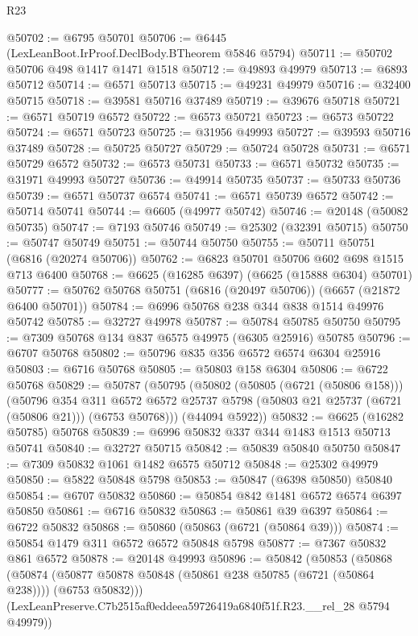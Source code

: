 \begin{lexlean}{R23}
\begin{coremodule}
@50702 := @6795 @50701
@50706 := @6445 (LexLeanBoot.IrProof.DeclBody.BTheorem @5846 @5794)
@50711 := @50702 @50706 @498 @1417 @1471 @1518
@50712 := @49893 @49979
@50713 := @6893 @50712
@50714 := @6571 @50713
@50715 := @49231 @49979
@50716 := @32400 @50715
@50718 := @39581 @50716 @37489
@50719 := @39676 @50718
@50721 := @6571 @50719 @6572
@50722 := @6573 @50721
@50723 := @6573 @50722
@50724 := @6571 @50723
@50725 := @31956 @49993
@50727 := @39593 @50716 @37489
@50728 := @50725 @50727
@50729 := @50724 @50728
@50731 := @6571 @50729 @6572
@50732 := @6573 @50731
@50733 := @6571 @50732
@50735 := @31971 @49993 @50727
@50736 := @49914 @50735
@50737 := @50733 @50736
@50739 := @6571 @50737 @6574
@50741 := @6571 @50739 @6572
@50742 := @50714 @50741
@50744 := @6605 (@49977 @50742)
@50746 := @20148 (@50082 @50735)
@50747 := @7193 @50746
@50749 := @25302 (@32391 @50715)
@50750 := @50747 @50749
@50751 := @50744 @50750
@50755 := @50711 @50751 (@6816 (@20274 @50706))
@50762 := @6823 @50701 @50706 @602 @698 @1515 @713 @6400
@50768 := @6625 (@16285 @6397) (@6625 (@15888 @6304) @50701)
@50777 := @50762 @50768 @50751 (@6816 (@20497 @50706)) (@6657 (@21872 @6400 @50701))
@50784 := @6996 @50768 @238 @344 @838 @1514 @49976 @50742
@50785 := @32727 @49978
@50787 := @50784 @50785 @50750
@50795 := @7309 @50768 @134 @837 @6575 @49975 (@6305 @25916) @50785
@50796 := @6707 @50768
@50802 := @50796 @835 @356 @6572 @6574 @6304 @25916
@50803 := @6716 @50768
@50805 := @50803 @158 @6304
@50806 := @6722 @50768
@50829 := @50787
    (@50795
      (@50802
        (@50805 (@6721 (@50806 @158)))
        (@50796
          @354
          @311
          @6572
          @6572
          @25737
          @5798
          (@50803 @21 @25737 (@6721 (@50806 @21)))
          (@6753 @50768)))
      (@44094 @5922))
@50832 := @6625 (@16282 @50785) @50768
@50839 := @6996 @50832 @337 @344 @1483 @1513 @50713 @50741
@50840 := @32727 @50715
@50842 := @50839 @50840 @50750
@50847 := @7309 @50832 @1061 @1482 @6575 @50712
@50848 := @25302 @49979
@50850 := @5822 @50848 @5798
@50853 := @50847 (@6398 @50850) @50840
@50854 := @6707 @50832
@50860 := @50854 @842 @1481 @6572 @6574 @6397 @50850
@50861 := @6716 @50832
@50863 := @50861 @39 @6397
@50864 := @6722 @50832
@50868 := @50860 (@50863 (@6721 (@50864 @39)))
@50874 := @50854 @1479 @311 @6572 @6572 @50848 @5798
@50877 := @7367 @50832 @861 @6572
@50878 := @20148 @49993
@50896 := @50842
    (@50853
      (@50868
        (@50874 (@50877 @50878 @50848 (@50861 @238 @50785 (@6721 (@50864 @238)))) (@6753 @50832)))
      (LexLeanPreserve.C7b2515af0eddeea59726419a6840f51f.R23.__rel_28 @5794 @49979))

\end{coremodule}
\end{lexlean}
